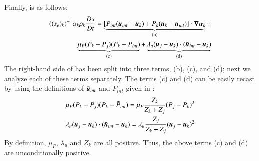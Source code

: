 \documentclass[preprint,10pt]{elsarticle}
\begin{document}
{\begin{appendices}
Finally, is as follows:
\begin{eqnarray}
\label{eq:ent3}
((s_e)_k)^{-1} \alpha_k \rho_k \frac{Ds}{Dt} = \underbrace{\left[ P_{int} (\boldsymbol u_{int}-\boldsymbol u_k) + P_k (\boldsymbol u_k-\boldsymbol u_{int}) \right] \cdot \boldsymbol\nabla \alpha_k}_\textrm{(b)} + \nonumber\\ 
\underbrace{\mu_P (P_k-P_j)(P_k-\bar{P}_{int})}_\textrm{(c)} + \underbrace{\lambda_u(\boldsymbol u_j-\boldsymbol u_k)\cdot(\bar{\boldsymbol u}_{int}-\boldsymbol u_k)}_\textrm{(d)}
\end{eqnarray}
The right-hand side of  has been split into three terms, (b), (c), and (d); next we analyze each of these terms separately. The terms (c) and (d) can be easily recast by using the definitions of $\bar{\boldsymbol u}_{int}$ and $\bar{P}_{int}$ given in :
\begin{eqnarray}
\label{eq:ent4}
\mu_P (P_k-P_j)(P_k-\bar{P}_{int}) = \mu_P \frac{Z_k}{Z_k+Z_j} (P_j - P_k)^2\nonumber\\
\lambda_u(\boldsymbol u_j-\boldsymbol u_k)\cdot(\bar{\boldsymbol u}_{int}-\boldsymbol u_k) = \lambda_u \frac{Z_j}{Z_k+Z_j} (\boldsymbol u_j - \boldsymbol u_k)^2 
\end{eqnarray}
By definition, $\mu_P$, $\lambda_u$ and $Z_k$ are all positive. Thus, the above terms (c) and (d) are unconditionally positive. 


\end{appendices}}
\end{document}
